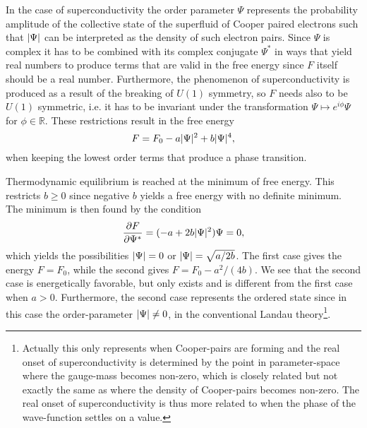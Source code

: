In the case of superconductivity the order parameter $\Psi$ represents the probability amplitude of the collective
state of the superfluid of Cooper paired electrons such that $\lvert \Psi \rvert$ can be interpreted as the density of such
electron pairs. Since $\Psi$ is complex it has to be combined with its complex conjugate $\Psi^\ast$ in ways that
yield real numbers to produce terms that are valid in the free energy since $F$ itself should be a real number.
Furthermore, the phenomenon of superconductivity is produced as a result of the breaking of $U(1)$ symmetry, so $F$
needs also to be $U(1)$ symmetric, i.e. it has to be invariant under the transformation $\Psi \mapsto e^{i\phi}\Psi$
for $\phi\in\mathbb{R}$. These restrictions result in the free energy
\begin{equation}
    \label{eq:statMech:LandauU1}
    F = F_0 - a\lvert \Psi \rvert^2 + b\lvert \Psi \rvert^4,
\end{equation}
when keeping the lowest order terms that produce a phase transition.

Thermodynamic equilibrium is reached at the minimum of free energy. This restricts $b\geq0$ since negative $b$ yields
a free energy with no definite minimum. The minimum is then found by the condition
\begin{equation}
    \label{eq:statMech:LandauExtreme}
    \frac{\partial F}{\partial \Psi^\ast} = (-a + 2b\lvert \Psi \rvert^2)\Psi = 0,
\end{equation}
which yields the possibilities $\lvert \Psi \rvert = 0$ or $\lvert \Psi \rvert = \sqrt{a/2b}$. The first case gives the energy $F = F_0$, while the second
gives $F = F_0 - a^2/(4b)$. We see that the second case is energetically favorable, but only exists and is different from
the first case when $a>0$. Furthermore, the second case represents the ordered state since in this case the order-parameter $\lvert \Psi \rvert \neq 0$,
in the conventional Landau theory\footnote{Actually this only represents when Cooper-pairs are forming and the real onset
of superconductivity is determined by the point in parameter-space where the gauge-mass becomes non-zero, which is closely
related but not exactly the same as where the density of Cooper-pairs becomes non-zero. The real onset of superconductivity is
thus more related to when the phase of the wave-function settles on a value.}.

